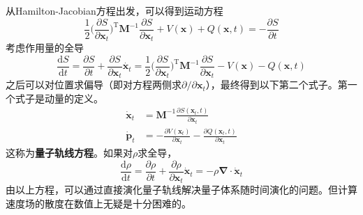         从Hamilton-Jacobian方程出发，可以得到运动方程
        \begin{equation*}
            \frac 12 \bigg(\frac {\partial S}{\partial \bm{x}_t}\bigg)^{\mathrm{T}} \bm{M}^{-1} \frac {\partial S}{\partial \bm{x}_t} + V(\bm{x}) + Q(\bm{x}, t) = -\frac {\partial S}{\partial t}
        \end{equation*}
        考虑作用量的全导
        \begin{equation*}
            \frac {\mathrm{d}S}{\mathrm{d}t} = \frac {\partial S}{\partial t} + \frac {\partial S}{\partial \bm{x}_t} \dot{\bm{x}_t} = \frac 12 \bigg(\frac {\partial S}{\partial \bm{x}_t}\bigg)^{\mathrm{T}} \bm{M}^{-1} \frac {\partial S}{\partial \bm{x}_t} - V(\bm{x}) - Q(\bm{x}, t)
        \end{equation*}
        之后可以对位置求偏导（即对方程两侧求${\partial} / {\partial \bm{x}_t}$），最终得到以下第二个式子。第一个式子是动量的定义。
        \begin{align*}
            \dot{\bm{x}}_t &= \bm{M}^{-1} \frac {\partial S(\bm{x}_t,t)}{\partial \bm{x}_t} \\
            \dot{\bm{p}}_t &= -\frac {\partial V(\bm{x}_t)}{\partial \bm{x}_t} - \frac {\partial Q(\bm{x}_t, t)}{\partial \bm{x}_t}
        \end{align*}
        这称为\textbf{量子轨线方程}。如果对$\rho$求全导，
        \begin{equation*}
            \frac {\mathrm{d}\rho}{\mathrm{d}t} = \frac {\partial \rho}{\partial t} + \frac {\partial \rho}{\partial \bm{x}_t} \dot{\bm{x}}_t = -\rho \bm{\nabla} \cdot \dot{\bm{x}}_t
        \end{equation*}
        由以上方程，可以通过直接演化量子轨线解决量子体系随时间演化的问题。但计算速度场的散度在数值上无疑是十分困难的。
        
        